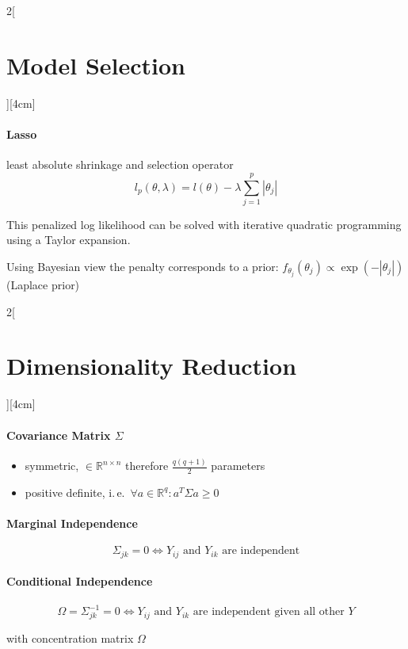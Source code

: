 \documentclass[8pt]{extarticle}
\begin{document}
\begin{multicols}{2}[\section{Model Selection}][4cm]
\paragraph{Lasso} least absolute shrinkage and selection operator \ \\
 
 $$l_p(\theta,\lambda) = l(\theta) - \lambda\sum_{j=1}^p |\theta_j|$$
 
 \noindent This penalized log likelihood can be solved with iterative quadratic programming using a Taylor expansion. 
 
 \noindent Using Bayesian view the penalty corresponds to a prior: $f_{\theta_j} (\theta_j)\propto \exp(-|\theta_j|)$ (Laplace prior)

\end{multicols}

\begin{multicols}{2}[\section{Dimensionality Reduction}][4cm]

\paragraph{Covariance Matrix \boldmath$\Sigma$}
\begin{itemize}
\item symmetric, $\in \mathbb{R}^{n\times n}$ therefore $\frac{q(q+1)}{2}$ parameters
\item positive definite, i.\,e.\ $\forall a \in \mathbb{R}^q: a^T\Sigma a \geq 0$
\end{itemize}

\paragraph{Marginal Independence}

$$\Sigma_{jk} = 0 \Leftrightarrow Y_{ij} \text{ and } Y_{ik} \text{ are independent}$$

\paragraph{Conditional Independence}

$$\Omega = \Sigma^{-1}_{jk} = 0 \Leftrightarrow Y_{ij} \text{ and } Y_{ik} \text{ are independent given all other } Y$$

with concentration matrix $\Omega$


\end{multicols}
\end{document}

